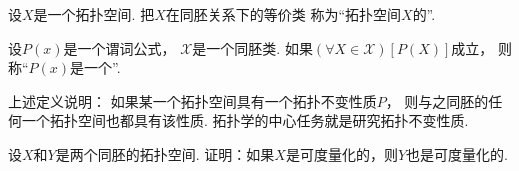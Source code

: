 \begin{definition}
设\(X\)是一个拓扑空间.
把\(X\)在同胚关系下的等价类
称为“拓扑空间\(X\)的”.
\end{definition}

\begin{definition}
设\(P(x)\)是一个谓词公式，
\(\mathcal{X}\)是一个同胚类.
如果\(
	(\forall X \in \mathcal{X})
	[P(X)]
\)成立，
则称“\(P(x)\)是一个”.
\end{definition}
\begin{remark}
上述定义说明：
如果某一个拓扑空间具有一个拓扑不变性质\(P\)，
则与之同胚的任何一个拓扑空间也都具有该性质.
{\color{red} 拓扑学的中心任务就是研究拓扑不变性质.}
\end{remark}

\begin{example}
设\(X\)和\(Y\)是两个同胚的拓扑空间.
证明：如果\(X\)是可度量化的，则\(Y\)也是可度量化的.
\end{example}
